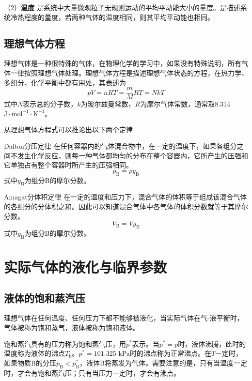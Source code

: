 \documentclass[lang=cn,newtx,11pt,scheme=chinese]{elegantbook}
\begin{document}
（2）\textbf{温度} \quad 是系统中大量微观粒子无规则运动的平均平动能大小的量度。是描述系统冷热程度的量度，若两种气体的温度相同，则其平均平动能也相同。

\subsection{理想气体方程}
理想气体是一种很特殊的气体，在物理化学的学习中，如果没有特殊说明，所有气体一律按照理想气体处理。理想气体方程是描述理想气体状态的方程，在热力学、多组分、化学平衡中都有用处，其表述为
\begin{equation}
	pV=nRT=\frac{m}{M}RT=NkT
\end{equation}
式中$N$表示总的分子数，$k$为玻尔兹曼常数，$R$为摩尔气体常数，通常取8.314 $\mathrm{J \cdot mol^{-1} \cdot K^{-1}}$。

从理想气体方程式可以推论出以下两个定律
\begin{theorem}{Dalton分压定律}
	在任何容器内的气体混合物中，在一定的温度下，如果各组分之间不发生化学反应，则每一种气体都均匀的分布在整个容器内，它所产生的压强和它单独占有整个容器时所产生的压强相同。
	\begin{equation}
		p_{\mathrm{B}}=py_{\mathrm{B}}
	\end{equation}
	式中$y_{\mathrm{B}}$为组分B的摩尔分数。
\end{theorem}

\begin{theorem}{Amagat分体积定律}
	在一定的温度和压力下，混合气体的体积等于组成该混合气体的各组分的分体积之和。因此可以知道混合气体中各气体的体积分数就等于其摩尔分数。
	\begin{equation}
		V_{\mathrm{B}}=Vy_{\mathrm{B}}
	\end{equation}
	式中$y_{\mathrm{B}}$为组分B的摩尔分数。
\end{theorem}

\section{实际气体的液化与临界参数}

\subsection{液体的饱和蒸汽压}
理想气体在任何温度、任何压力下都不能够被液化，当实际气体在气-液平衡时，气体被称为饱和蒸气，液体被称为饱和液体。

饱和蒸汽具有的压力称为饱和蒸气压，用$p^*$表示。当$p^*=p$时，液体沸腾，此时的温度称为液体的沸点$T_\mathrm{b}$。$p^* = 101.325$ kPa时的沸点称为正常沸点。在$T$一定时，如果物质B的分压$p_\mathrm{B}<p_\mathrm{B}^*$，液体B将蒸发为气体。需要注意的是，只有当温度一定时，才会有饱和蒸汽压；只有当压力一定时，才会有沸点。
\end{document}
